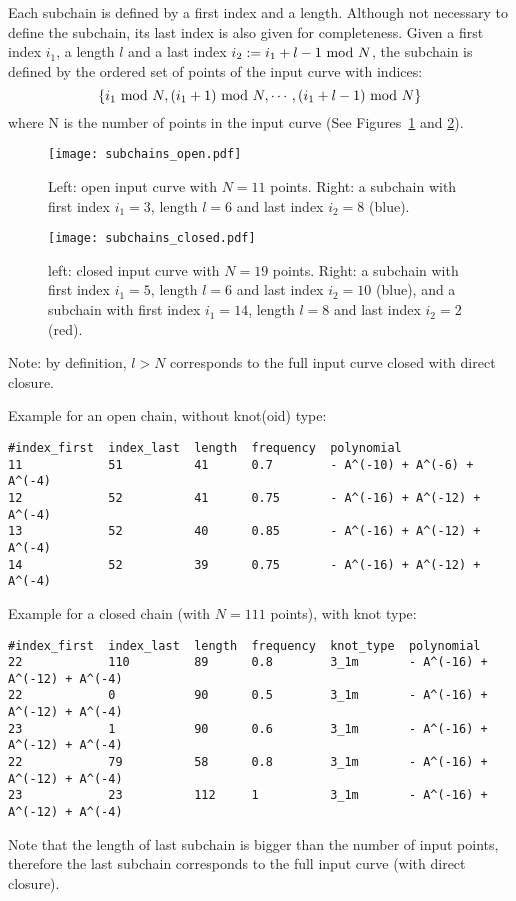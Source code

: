 Each subchain is defined by a first index  and a length. Although not necessary to define the subchain, its last index is also given for completeness. Given a first index $i_1$, a length $l$ and a last index $i_2:=i_1+l-1{\rm\ mod\ } N$, the subchain is defined by the ordered set of points of the input curve with indices:
\[\{i_1{\rm\ mod\ } N,(i_1+1){\rm\ mod\ } N,\cdots,(i_1+l-1){\rm\ mod\ } N\}\]
where N is the number of points in the input curve (See Figures~\ref{fig:subchains:open} and \ref{fig:subchains:closed}).  
\begin{figure}[t]
\centering
\texttt{[image: subchains\_open.pdf]}
\caption{Left: open input curve with $N=11$ points. Right: a subchain with first index $i_1=3$, length $l=6$ and last index $i_2=8$ (blue).}\label{fig:subchains:open}
\end{figure}
\begin{figure}[t]
\centering
\texttt{[image: subchains\_closed.pdf]}
\caption{left: closed input curve with $N=19$ points. Right: a subchain with first index $i_1=5$, length $l=6$ and last index $i_2=10$ (blue), and a  subchain with first index $i_1=14$, length $l=8$ and last index $i_2=2$ (red).}\label{fig:subchains:closed}
\end{figure}

Note: by definition, $l>N$ corresponds to the full input curve closed with direct closure.


Example for an open chain, without knot(oid) type:
\begin{lstlisting}
#index_first  index_last  length  frequency  polynomial
11            51          41      0.7        - A^(-10) + A^(-6) + A^(-4)
12            52          41      0.75       - A^(-16) + A^(-12) + A^(-4)
13            52          40      0.85       - A^(-16) + A^(-12) + A^(-4)
14            52          39      0.75       - A^(-16) + A^(-12) + A^(-4)
\end{lstlisting}

Example for a closed chain (with $N=111$ points), with knot type:
\begin{lstlisting}
#index_first  index_last  length  frequency  knot_type  polynomial
22            110         89      0.8        3_1m       - A^(-16) + A^(-12) + A^(-4)
22            0           90      0.5        3_1m       - A^(-16) + A^(-12) + A^(-4)
23            1           90      0.6        3_1m       - A^(-16) + A^(-12) + A^(-4)
22            79          58      0.8        3_1m       - A^(-16) + A^(-12) + A^(-4)
23            23          112     1          3_1m       - A^(-16) + A^(-12) + A^(-4)
\end{lstlisting}
Note that the length of last subchain is bigger than the number of input points, therefore the last subchain corresponds to the full input curve (with direct closure).

